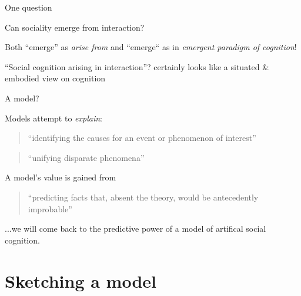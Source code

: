 \documentclass[compress]{beamer}
\begin{document}
\begin{frame}{One question}

    \Large
    \centering

    Can sociality emerge from interaction?

    \pause
    \normalsize
    \vspace{2em}

    Both ``emerge'' as \emph{arise from} and ``emerge`` as in \emph{emergent paradigm of
    cognition}!

    \pause

    ``Social cognition arising in interaction''? certainly looks like a situated \&
    embodied view on cognition

\end{frame}


{
\begin{frame}{A model?}

    Models attempt to \emph{explain}: 
    \begin{quote}
        ``identifying the causes for an event or phenomenon of interest''
    \end{quote}
    \begin{quote}
        ``unifying disparate phenomena''
    \end{quote}

        A model's value is gained from
    \begin{quote}
        ``predicting facts that, absent the theory, would be antecedently
        improbable''
    \end{quote}

    \pause

    ...we will come back to the predictive power of a model of artifical social
    cognition.

\end{frame}
}




\section{Sketching a model}

\end{document}
